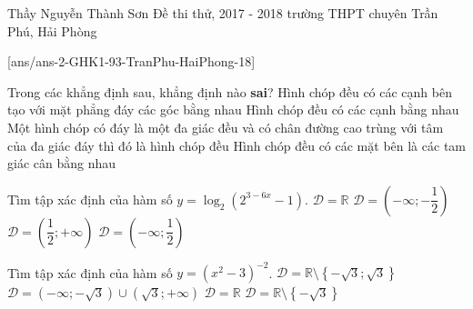 
\begin{name}
{Thầy Nguyễn Thành Sơn}
{Đề thi thử, 2017 - 2018 trường THPT chuyên Trần Phú, Hải Phòng}
\end{name}
\setcounter{ex}{0}
[ans/ans-2-GHK1-93-TranPhu-HaiPhong-18]
\begin{ex}%
	Trong các khẳng định sau, khẳng định nào \textbf{sai}?
	\choice
	{Hình chóp đều có các cạnh bên tạo với mặt phẳng đáy các góc bằng nhau}
	{\True Hình chóp đều có các cạnh bằng nhau}
	{Một hình chóp có đáy là một đa giác đều và có chân đường cao trùng với tâm của đa giác đáy thì đó là hình chóp đều}
	{Hình chóp đều có các mặt bên là các tam giác cân bằng nhau}
\end{ex}
\begin{ex}%
	Tìm tập xác định của hàm số $y=\log _2\left(2^{3-6x}-1\right)$.
	\choice
	{$\mathscr{D}=\mathbb{R}$}
	{$\mathscr{D}=\left(-\infty; -\dfrac{1}{2}\right)$}
	{$\mathscr{D}=\left(\dfrac{1}{2}; \text{+}\infty \right)$}
	{\True $\mathscr{D}=\left(-\infty; \dfrac{1}{2}\right)$}
\end{ex}
\begin{ex}%
	Tìm tập xác định của hàm số $y=\left(x^2-3 \right)^{-2}$.
	\choice
	{\True $\mathscr{D}=\mathbb{R}\setminus \left\{-\sqrt{3};\sqrt{3}\right\}$}
	{$\mathscr{D}=\left(-\infty; -\sqrt{3}\right)\cup \left(\sqrt{3}; \text{+}\infty \right)$}
	{$\mathscr{D}=\mathbb{R}$}
	{$\mathscr{D}=\mathbb{R}\setminus \left\{-\sqrt{3}\right\}$}
\end{ex}
